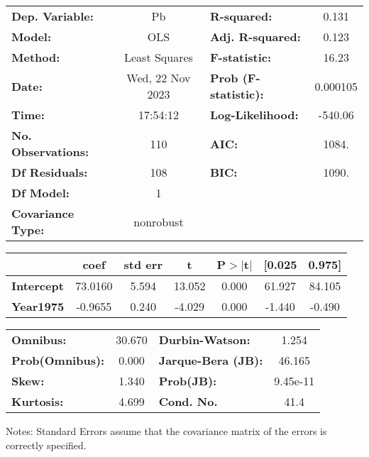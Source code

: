 \begin{center}
\begin{tabular}{lclc}
\toprule
\textbf{Dep. Variable:}    &        Pb        & \textbf{  R-squared:         } &     0.131   \\
\textbf{Model:}            &       OLS        & \textbf{  Adj. R-squared:    } &     0.123   \\
\textbf{Method:}           &  Least Squares   & \textbf{  F-statistic:       } &     16.23   \\
\textbf{Date:}             & Wed, 22 Nov 2023 & \textbf{  Prob (F-statistic):} &  0.000105   \\
\textbf{Time:}             &     17:54:12     & \textbf{  Log-Likelihood:    } &   -540.06   \\
\textbf{No. Observations:} &         110      & \textbf{  AIC:               } &     1084.   \\
\textbf{Df Residuals:}     &         108      & \textbf{  BIC:               } &     1090.   \\
\textbf{Df Model:}         &           1      & \textbf{                     } &             \\
\textbf{Covariance Type:}  &    nonrobust     & \textbf{                     } &             \\
\bottomrule
\end{tabular}
\begin{tabular}{lcccccc}
                   & \textbf{coef} & \textbf{std err} & \textbf{t} & \textbf{P$> |$t$|$} & \textbf{[0.025} & \textbf{0.975]}  \\
\midrule
\textbf{Intercept} &      73.0160  &        5.594     &    13.052  &         0.000        &       61.927    &       84.105     \\
\textbf{Year1975}  &      -0.9655  &        0.240     &    -4.029  &         0.000        &       -1.440    &       -0.490     \\
\bottomrule
\end{tabular}
\begin{tabular}{lclc}
\textbf{Omnibus:}       & 30.670 & \textbf{  Durbin-Watson:     } &    1.254  \\
\textbf{Prob(Omnibus):} &  0.000 & \textbf{  Jarque-Bera (JB):  } &   46.165  \\
\textbf{Skew:}          &  1.340 & \textbf{  Prob(JB):          } & 9.45e-11  \\
\textbf{Kurtosis:}      &  4.699 & \textbf{  Cond. No.          } &     41.4  \\
\bottomrule
\end{tabular}
\end{center}

Notes: \newline
 [1] Standard Errors assume that the covariance matrix of the errors is correctly specified.